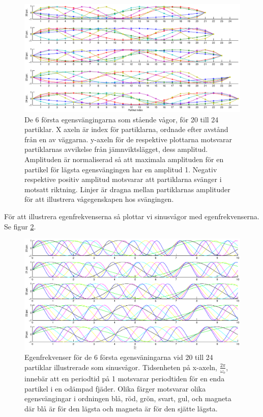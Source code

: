 \documentclass[12pt,a4paper]{article}
\begin{document}
		\begin{figure}
			\hspace{-1.5cm}\includegraphics[width=1.2\textwidth]{staendevagor.eps}
			\caption{De 6 första egensvängingarna som stående vågor, för 20 till 24 partiklar.
			X axeln är index för partiklarna, ordnade efter avstånd från en av väggarna. y-axeln
			för de respektive plottarna motsvarar partiklarnas avvikelse från jämnviktslägget,
			dess amplitud. Amplituden är normaliserad så att maximala amplituden för en partikel
			för lägsta egensvängingen har en amplitud 1. Negativ respektive positiv amplitud motsvarar
			att partiklarna svänger i motsatt riktning. Linjer är dragna mellan partiklarnas amplituder
			för att illustrera vågegenskapen hos svängingen.}
			\label{stavag}
		\end{figure}
		
		För att illustrera egenfrekvenserna så plottar vi sinusvågor med egenfrekvenserna. Se figur \ref{egenf}.
		
		
		\begin{figure}
			\hspace{-1.5cm}\includegraphics[width=1.2\textwidth]{egenfrekvenser.eps}
			\caption{Egenfrekvenser för de 6 första egensväningarna vid 20 till 24 partiklar
			illustrerade som sinusvågor. Tidsenheten på x-axeln, $\frac{2\pi}{\omega_o}$,
			innebär att en periodtid på 1 motsvarar periodtiden för en enda partikel i en
			odämpad fjäder. Olika färger motsvarar olika egensvängingar i ordningen blå, röd,
			grön, svart, gul, och magneta där blå är för den lägsta och magneta är för den sjätte lägsta.}
			\label{egenf}
		\end{figure}
		
\end{document}
